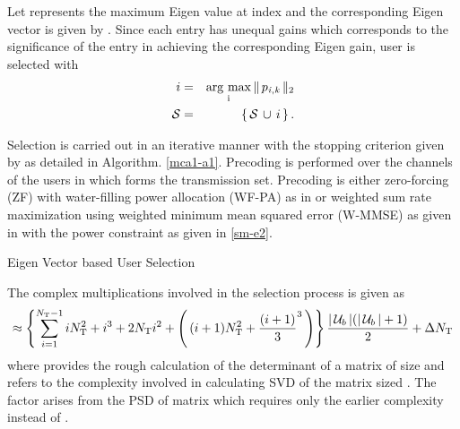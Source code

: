 Let  represents the maximum Eigen value at  index and the corresponding Eigen vector is given by . Since each entry  has unequal gains which corresponds to the significance of the entry in achieving the corresponding Eigen gain, user  is selected with
\begin{eqnarray}
i &=& \operatorname*{\arg\,max}_{\mathrm{i}} \|\, {p}_{\mathit{i},\mathit{k}} \,\|_{2} \label{mca1-e3:1} \\
\mathcal{S} &=& \left \lbrace \, \mathcal{S} \, \cup \, i \, \right \rbrace.
\label{mca1-e3}
\end{eqnarray}

Selection is carried out in an iterative manner with the stopping criterion given by  as detailed in Algorithm. \ref{mca1-a1}. Precoding is performed over the channels of the users in  which forms the transmission set. Precoding is either zero-forcing (ZF) with water-filling power allocation (WF-PA) as in \cite{tse2005fundamentals} or weighted sum rate maximization using weighted minimum mean squared error (W-MMSE) as given in \cite{wmmse_shi} with the power constraint as given in \eqref{sm-e2}.

\begin{algorithm}
 \SetAlgoLined
 \DontPrintSemicolon
 \caption{Eigen Vector based User Selection}
 \label{mca1-a1}
\end{algorithm}

The complex multiplications involved in the selection process is given as
\begin{equation}
\approx \left \lbrace \sum_{i = 1}^{N_{\mathrm{T}} - 1} iN^2_{\mathrm{T}} + i^3 + 2N_{\mathrm{T}}i^2 + \left ( \, (i+1)N^2_{\mathrm{T}} + \frac{(i+1)}{3}^3 \, \right ) \right \rbrace \frac{| \, \mathcal{U}_b \, |(| \, \mathcal{U}_b \, | + 1)}{2} + \Delta N_{\mathrm{T}}
\label{mca1-e4}
\end{equation}
where  provides the rough calculation of the determinant of a matrix of size  and \me{\Delta} refers to the complexity involved in calculating SVD of the matrix sized . The factor  arises from the PSD of matrix  which requires only the earlier complexity instead of .
